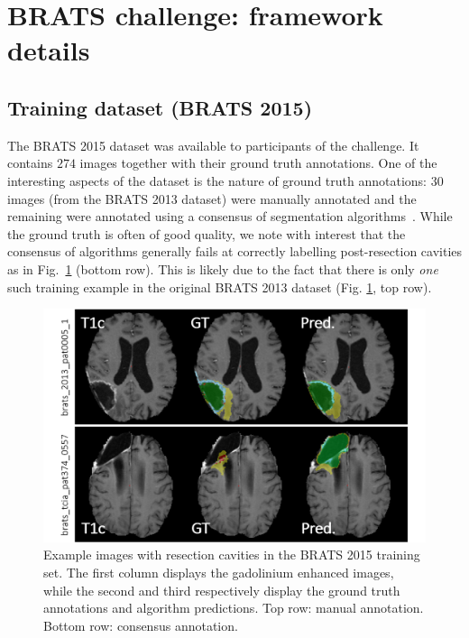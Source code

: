 
\section{BRATS challenge: framework details}
\label{sec: results}

\subsection{Training dataset (BRATS 2015)}

The BRATS 2015 dataset was available to participants of the challenge. 
It contains $274$ images together with their ground truth annotations. 
One of the interesting aspects of the dataset is the nature of ground truth annotations: $30$ images 
(from the BRATS 2013 dataset) were manually annotated and the remaining were annotated using a consensus of 
segmentation algorithms~\cite{menze2015multimodal}. 
While the ground truth is often of good quality, we note with interest that the consensus of algorithms generally fails at correctly labelling post-resection cavities as in Fig.~\ref{fig:post-resection-cavities} (bottom row). This is likely due to the fact that there is only \textit{one} such training example in the original BRATS 2013 dataset (Fig. \ref{fig:post-resection-cavities}, top row). 

\begin{figure}
\centering
\includegraphics[width=1\textwidth]{images/BRATS2015_post-resection-cavities.png}
\caption{Example images with resection cavities in the BRATS 2015 training set. The first column displays the gadolinium enhanced images, while the second and third respectively display the ground truth annotations and algorithm predictions. Top row: manual annotation. Bottom row: consensus annotation.}
\label{fig:post-resection-cavities}
\end{figure}

